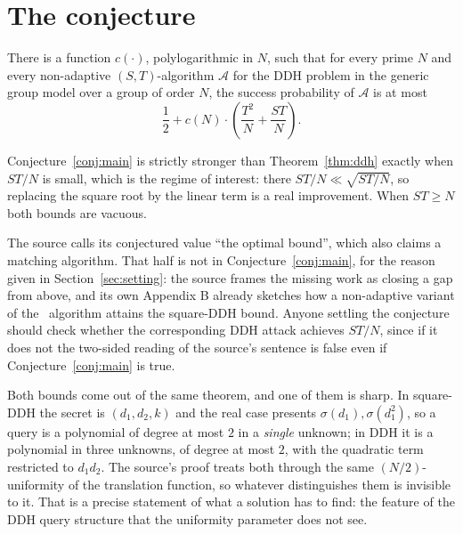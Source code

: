 \documentclass{conjura-conjecture}
\newcommand{\Adv}{\mathcal{A}}
\begin{document}
\section{The conjecture}\label{sec:conjectures}

\begin{conjecture}\label{conj:main}
There is a function $c(\cdot)$, polylogarithmic in $N$, such that for
every prime $N$ and every non-adaptive $(S,T)$-algorithm $\Adv$ for the
DDH problem in the generic group model over a group of order $N$, the
success probability of $\Adv$ is at most
\[
  \frac{1}{2}
  + c(N) \cdot \left( \frac{T^{2}}{N} + \frac{S T}{N} \right).
\]
\end{conjecture}

\begin{remark}
Conjecture~\ref{conj:main} is strictly stronger than
Theorem~\ref{thm:ddh} exactly when $ST/N$ is small, which is the
regime of interest: there $ST/N \ll \sqrt{ST/N}$, so replacing the
square root by the linear term is a real improvement. When $ST \ge N$
both bounds are vacuous.
\end{remark}

\begin{remark}\label{rem:lower}
The source calls its conjectured value ``the optimal bound'', which
also claims a matching algorithm. That half is not in
Conjecture~\ref{conj:main}, for the reason given in
Section~\ref{sec:setting}: the source frames the missing work as
closing a gap from above, and its own Appendix B already sketches how a
non-adaptive variant of the~\cite{CK18} algorithm attains the
square-DDH bound. Anyone settling the conjecture should check whether
the corresponding DDH attack achieves $ST/N$, since if it does not the
two-sided reading of the source's sentence is false even if
Conjecture~\ref{conj:main} is true.
\end{remark}

\begin{remark}
Both bounds come out of the same theorem, and one of them is sharp. In
square-DDH the secret is $(d_{1}, d_{2}, k)$ and the real case presents
$\sigma(d_{1}), \sigma(d_{1}^{2})$, so a query is a polynomial of
degree at most $2$ in a \emph{single} unknown; in DDH it is a
polynomial in three unknowns, of degree at most $2$, with the quadratic
term restricted to $d_{1}d_{2}$. The source's proof treats both through
the same $(N/2)$-uniformity of the translation function, so whatever
distinguishes them is invisible to it. That is a precise statement of
what a solution has to find: the feature of the DDH query structure
that the uniformity parameter does not see.
\end{remark}
\end{document}
